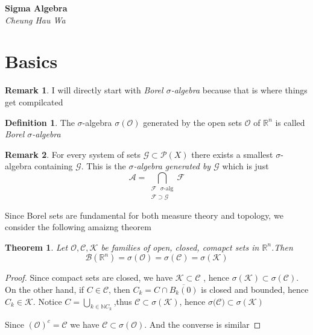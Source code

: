 \documentclass{article}
\newtheorem{theorem}{Theorem}[section]
\theoremstyle{definition}
\newtheorem{definition}{Definition}[section]
\newtheorem*{remark}{Remark}
\newcommand{\m}[1]{$ #1 $}
\begin{document}
	

\begin{titlepage}
   \begin{center}
      \Large\textbf{Sigma Algebra}\\
      \large\textit{Cheung Hau Wa}
   \end{center}
\end{titlepage}
\section{Basics}
\begin{remark}
	I will directly start with \textit{Borel $\sigma$-algebra} because that is where things get compilcated
\end{remark}
\begin{definition}
	The $\sigma$-algebra $\sigma(\mathscr{O})$ generated by the open sets $\mathscr{O}$ of $\mathbb{R}^n$ is called \textit{Borel $\sigma$-algebra}
\end{definition}
\begin{remark}
	For every system of sets $\mathscr{G} \subset \mathscr{P}(X)$ there exists a smallest $\sigma$-algebra containing $\mathscr{G}$. This is the \textit{$\sigma$-algebra generated by $\mathscr{G}$} which is just \begin{equation*}
		\mathscr{A} = \bigcap_{\substack{\mathscr{F} \text{ }\sigma\text{-alg} \\ \mathscr{F} \supset \mathscr{G}}} \mathscr{F}
	\end{equation*}
\end{remark}
	
Since Borel sets are fundamental for both measure theory and topology, we consider the following amaizng theorem
\begin{theorem}
	Let $\mathscr{O,C,K}$ be families of open, closed, comapct sets in $\mathbb{R}^n$.Then 
	\begin{equation*}
		\mathscr{B}(\mathbb{R}^n) = \sigma(\mathscr{O}) = \sigma(\mathscr{C}) = \sigma(\mathscr{K})
	\end{equation*}
\end{theorem}
\begin{proof}
	Since compact sets are closed, we have $\mathscr{K} \subset \mathscr{C}$ , hence $\sigma(\mathscr{K}) \subset \sigma(\mathscr{C})$. On the other hand, if $C \in \mathscr{C} \text{, then } C_k = C \cap \overline{B_k(0)} $ is closed and bounded, hence $C_k \in \mathscr{K}$. Notice \m{C = \bigcup_{k \in \mathbb{N} C_k}},thus \m{\mathscr{C} \subset \sigma(\mathscr{K})}, hence \m{\sigma(\mathscr{C)} \subset \sigma(\mathscr{K})}

	Since \m{(\mathscr{O})^c=\mathscr{C}} we have \m{\mathscr{C} \subset \sigma(\mathscr{O})}.
	And the converse is similar
\end{proof}
\end{document}
